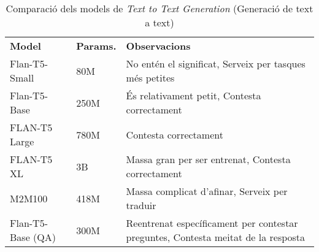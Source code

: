 \begin{table}[H]
    \centering
    \begin{tabular}{|>{\centering}m{2.3cm}|m{1.6cm}|m{10.7cm}|}
        \hline
        \multicolumn{3}{|c|}{\textbf{Models de \textit{Text to Text Generation}}} \\
        \hline
        \textbf{Model} & \textbf{Params.} & \textbf{Observacions} \\
        \hline
        Flan-T5-Small & 80M & No entén el significat, Serveix per tasques més petites \\
        Flan-T5-Base & 250M & És relativament petit, Contesta correctament \\
        FLAN-T5 Large & 780M & Contesta correctament \\
        FLAN-T5 XL & 3B & Massa gran per ser entrenat, Contesta correctament \\
        M2M100 & 418M & Massa complicat d'afinar, Serveix per traduir \\
        Flan-T5-Base (QA) & 300M & Reentrenat específicament per contestar preguntes, Contesta meitat de la resposta  \\
        \hline
    \end{tabular}
    \caption[Comparació dels models de \textit{Text to Text Generation}]{Comparació dels models de \textit{Text to Text Generation} (Generació de text a text)}
    \label{tab:t2t-comparison}
\end{table}
